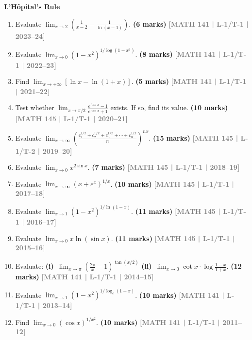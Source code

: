 \documentclass[12pt,a4paper]{article}
\newcommand{\yr}[1]{\hfill\textcolor{gray}{\small\textbf{[#1]}}}
\newcommand{\mk}[1]{\textcolor{orange!70!black}{\small\textbf{(#1 marks)}}}
\newcommand{\subtopic}[2]{%
  \vspace{10pt}
  \noindent\begin{tcolorbox}[colback=#1!8,colframe=#1,boxrule=0.6pt,arc=4pt,
    left=6pt,right=6pt,top=4pt,bottom=4pt]
    \small\bfseries\textcolor{#1}{#2}
  \end{tcolorbox}
  \vspace{2pt}
}
\begin{document}
\subtopic{cA}{L'H\^{o}pital's Rule}
\label{sub:s1-lhospital}

\begin{enumerate}\item Evaluate $\displaystyle\lim_{x\to 2}\!\left(\frac{1}{x-2}-\frac{1}{\ln(x-1)}\right)$.
\mk{6} \yr{MATH 141 | L-1/T-1 | 2023--24}

\item Evaluate $\displaystyle\lim_{x\to 0}(1-x^{2})^{1/\log(1-x^{2})}$.
\mk{8} \yr{MATH 141 | L-1/T-1 | 2022--23}


\item Find $\displaystyle\lim_{x\to+\infty}[\ln x-\ln(1+x)]$.
\mk{5} \yr{MATH 141 | L-1/T-1 | 2021--22}

\item Test whether $\displaystyle\lim_{x\to\pi/2}\frac{e^{\tan x}-1}{e^{\tan x}+1}$ exists. If so, find its value.
\mk{10} \yr{MATH 145 | L-1/T-1 | 2020--21}

\item Evaluate $\displaystyle\lim_{x\to\infty}\!\left(\frac{c_{1}^{1/x}+c_{2}^{1/x}+c_{3}^{1/x}+\cdots+c_{n}^{1/x}}{n}\right)^{nx}$.
\mk{15} \yr{MATH 145 | L-1/T-2 | 2019--20}

\item Evaluate $\displaystyle\lim_{x\to 0}x^{2\sin x}$.
\mk{7} \yr{MATH 145 | L-1/T-1 | 2018--19}

\item Evaluate $\displaystyle\lim_{x\to\infty}(x+e^{x})^{1/x}$.
\mk{10} \yr{MATH 145 | L-1/T-1 | 2017--18}

\item Evaluate $\displaystyle\lim_{x\to 1}(1-x^{2})^{1/\ln(1-x)}$.
\mk{11} \yr{MATH 145 | L-1/T-1 | 2016--17}

\item Evaluate $\displaystyle\lim_{x\to 0}x\ln(\sin x)$.
\mk{11} \yr{MATH 145 | L-1/T-1 | 2015--16}

\item Evaluate: \textbf{(i)}~$\displaystyle\lim_{x\to\pi}\!\left(\frac{2\pi}{x}-1\right)^{\!\tan(x/2)}$ \quad \textbf{(ii)}~$\displaystyle\lim_{x\to 0}\cot x\cdot\log\frac{1-x}{1+x}$.
\mk{12} \yr{MATH 141 | L-1/T-1 | 2014--15}

\item Evaluate $\displaystyle\lim_{x\to 1}(1-x^{2})^{1/\log_{e}(1-x)}$.
\mk{10} \yr{MATH 141 | L-1/T-1 | 2013--14}

\item Find $\displaystyle\lim_{x\to 0}(\cos x)^{1/x^{2}}$.
\mk{10} \yr{MATH 141 | L-1/T-1 | 2011--12}


\end{enumerate}
\end{document}

